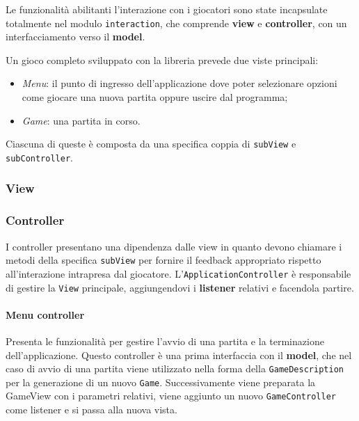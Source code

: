 Le funzionalità abilitanti l'interazione con i giocatori sono state incapsulate totalmente nel modulo \texttt{interaction}, che comprende \textbf{view} e \textbf{controller}, con un interfacciamento verso il \textbf{model}.

Un gioco completo sviluppato con la libreria prevede due viste principali:
\begin{itemize}
    \item \textit{Menu}: il punto di ingresso dell'applicazione dove poter selezionare opzioni come giocare una nuova partita oppure uscire dal programma;
    \item \textit{Game}: una partita in corso.
\end{itemize}
%
Ciascuna di queste è composta da una specifica coppia di \texttt{subView} e \texttt{subController}.
%

\subsubsection{View}
\subsubsection{Controller}
I controller presentano una dipendenza dalle view in quanto devono chiamare i metodi della specifica \texttt{subView} per fornire il feedback appropriato rispetto all'interazione intrapresa dal giocatore.
%
L'\texttt{ApplicationController} è responsabile di gestire la \texttt{View} principale, aggiungendovi i \textbf{listener} relativi e facendola partire.
\paragraph{Menu controller}
%
Presenta le funzionalità per gestire l'avvio di una partita e la terminazione dell'applicazione.
%
Questo controller è una prima interfaccia con il \textbf{model}, che nel caso di avvio di una partita viene utilizzato nella forma della \texttt{GameDescription} per la generazione di un nuovo \texttt{Game}.
%
Successivamente viene preparata la GameView con i parametri relativi, viene aggiunto un nuovo \texttt{GameController} come listener e si passa alla nuova vista.
